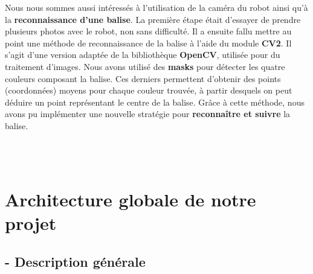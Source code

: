 \documentclass[12pt]{article}
\begin{document}
\hspace{\parindent}Nous nous sommes aussi intéressés à l'utilisation de la caméra du robot ainsi qu'à la \textbf{reconnaissance d'une balise}. La première étape était d'essayer de prendre plusieurs photos avec le robot, non sans difficulté. Il a ensuite fallu mettre au point une méthode de reconnaissance de la balise à l'aide du module \textbf{CV2}. Il s'agit d'une version adaptée de la bibliothèque \textbf{OpenCV}, utilisée pour du traitement d'images. Nous avons utilisé des \textbf{masks} pour détecter les quatre couleurs composant la balise. Ces derniers permettent d'obtenir des points (coordonnées) moyens pour chaque couleur trouvée, à partir desquels on peut déduire un point représentant le centre de la balise. Grâce à cette méthode, nous avons pu implémenter une nouvelle stratégie pour \textbf{reconnaître et suivre} la balise.


\\
\clearpage
\\
\section*{Architecture globale de notre projet}

\subsection*{- Description générale}
\end{document}
